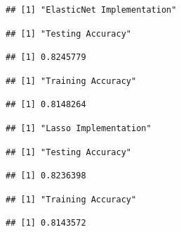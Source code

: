 \documentclass[
]{article}
\begin{document}
\begin{verbatim}
## [1] "ElasticNet Implementation"
\end{verbatim}

\begin{verbatim}
## [1] "Testing Accuracy"
\end{verbatim}

\begin{verbatim}
## [1] 0.8245779
\end{verbatim}

\begin{verbatim}
## [1] "Training Accuracy"
\end{verbatim}

\begin{verbatim}
## [1] 0.8148264
\end{verbatim}

\begin{verbatim}
## [1] "Lasso Implementation"
\end{verbatim}

\begin{verbatim}
## [1] "Testing Accuracy"
\end{verbatim}

\begin{verbatim}
## [1] 0.8236398
\end{verbatim}

\begin{verbatim}
## [1] "Training Accuracy"
\end{verbatim}

\begin{verbatim}
## [1] 0.8143572
\end{verbatim}
\end{document}
